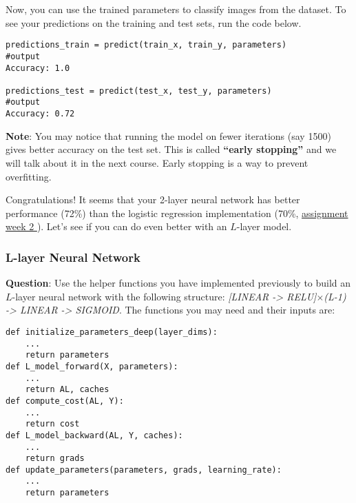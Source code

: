 Now, you can use the trained parameters to classify images from the dataset. To see your predictions on the training and test sets, run the code below.
\begin{verbatim}
predictions_train = predict(train_x, train_y, parameters)
#output
Accuracy: 1.0

predictions_test = predict(test_x, test_y, parameters)
#output
Accuracy: 0.72
\end{verbatim}

{\textbf {Note}}: You may notice that running the model on fewer iterations (say 1500) gives better accuracy on the test set. This is called {\color{red} \textbf {``early stopping''}} and we will talk about it in the next course. Early stopping is a way to prevent overfitting. 

Congratulations! It seems that your 2-layer neural network has better performance (72\%) than the logistic regression implementation (70\%, \hyperref[sec:logistic_regression]{assignment week 2 }). Let's see if you can do even better with an $L$-layer model.



\subsubsection{L-layer Neural Network}

{\textbf {Question}}: Use the helper functions you have implemented previously to build an $L$-layer neural network with the following structure: \emph{[LINEAR -> RELU]$\times$(L-1) -> LINEAR -> SIGMOID}. The functions you may need and their inputs are:
\begin{verbatim}
def initialize_parameters_deep(layer_dims):
    ...
    return parameters 
def L_model_forward(X, parameters):
    ...
    return AL, caches
def compute_cost(AL, Y):
    ...
    return cost
def L_model_backward(AL, Y, caches):
    ...
    return grads
def update_parameters(parameters, grads, learning_rate):
    ...
    return parameters
\end{verbatim}

